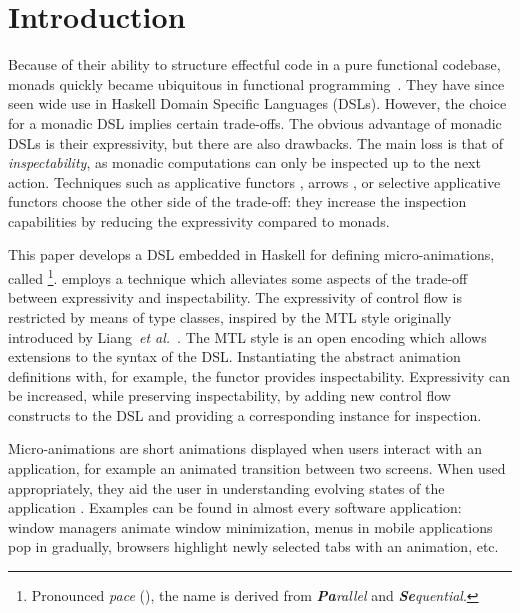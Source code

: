 \section{Introduction}
\label{sec:intro}


Because of their ability to structure effectful code in a pure functional codebase, monads quickly became ubiquitous in functional programming~\cite{DBLP:conf/lfp/Wadler90}. They have since seen wide use in Haskell Domain Specific Languages (DSLs). However, the choice for a monadic DSL implies certain trade-offs.  The obvious advantage of monadic DSLs is their expressivity, but there are also drawbacks. The main loss is that of \emph{inspectability}, as monadic computations can only be inspected up to the next action.  Techniques such as applicative functors \cite{DBLP:journals/jfp/McbrideP08}, arrows \cite{DBLP:journals/scp/Hughes00}, or selective applicative functors \cite{Mokhov:2019:SAF:3352468.3341694} choose the other side of the trade-off: they increase the inspection capabilities by reducing the expressivity compared to monads.

This paper develops a DSL embedded in Haskell for defining micro-animations, called \dsl{}\footnote{Pronounced \textit{pace} (), the name is derived from \textit{\textbf{Pa}rallel} and \textit{\textbf{Se}quential}.}. \dsl{} employs a technique which alleviates some aspects of the trade-off between expressivity and inspectability. The expressivity of control flow is restricted by means of type classes, inspired by the MTL style originally introduced by Liang~\emph{et al.}~\cite{DBLP:conf/popl/LiangHJ95}. The MTL style is an open encoding which allows extensions to the syntax of the DSL. Instantiating the abstract animation definitions with, for example, the  functor provides inspectability.  Expressivity can be increased, while preserving inspectability, by adding new control flow constructs to the DSL and providing a corresponding instance for inspection.

Micro-animations are short animations displayed when users interact with an application, for example an animated transition between two screens. When used appropriately, they aid the user in understanding evolving states of the application \cite{DBLP:conf/infovis/BedersonB99,DBLP:conf/chi/Gonzalez96,DBLP:journals/tvcg/HeerR07}.  Examples can be found in almost every software application: window managers animate window minimization, menus in mobile applications pop in gradually, browsers highlight newly selected tabs with an animation, etc.

